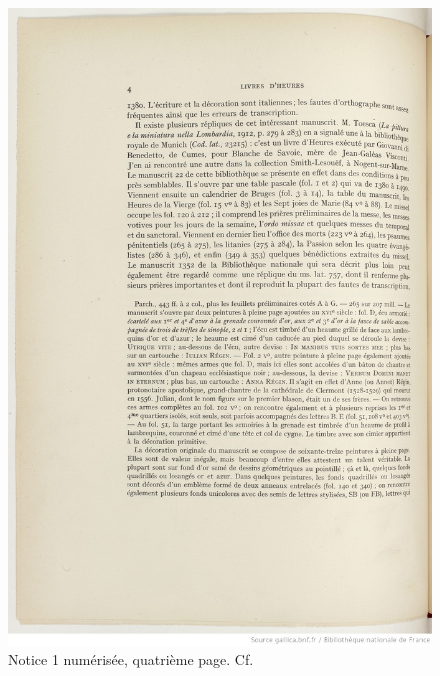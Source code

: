 \documentclass[a4paper,12pt,twoside]{book}
\begin{document}
    \begin{figure}[!h]
    \centering
    \includegraphics[width=15cm]{img/Notices_Leroquais/Notice1/Papier/notice_papier_1_4.jpeg}
    \caption{Notice 1 numérisée, quatrième page. Cf. \cite[p. 4]{Leroquais_notices}}
    \end{figure}
    \clearpage
    
\end{document}
